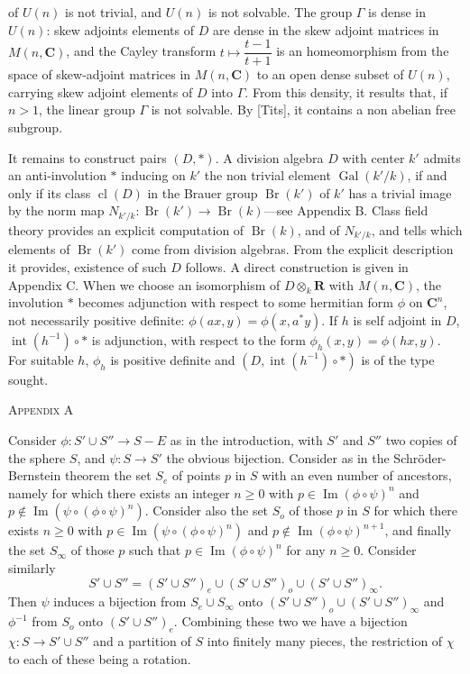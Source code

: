 \documentclass[10pt,a4paper]{article}
\DeclareMathOperator{\Gal}{Gal}
\DeclareMathOperator{\Br}{Br}
\DeclareMathOperator{\cl}{cl}
\DeclareMathOperator{\ImOp}{Im}
\newcommand{\Intop}{\operatorname{int}}
\newcommand{\AppendixHeading}[1]{\par\vspace{1.2em}\begin{center}\textsc{Appendix #1}\end{center}\vspace{0.6em}\par}
\begin{document}
\newpage
of $U(n)$ is not trivial, and $U(n)$ is not solvable. The group $\Gamma$ is dense in $U(n)$:
skew adjoints elements of $D$ are dense in the skew adjoint matrices in $M(n,\mathbf{C})$,
and the Cayley transform $t\mapsto\dfrac{t-1}{t+1}$ is an homeomorphism from the space of
skew-adjoint matrices in $M(n,\mathbf{C})$ to an open dense subset of $U(n)$, carrying
skew adjoint elements of $D$ into $\Gamma$. From this density, it results that, if $n>1$,
the linear group $\Gamma$ is not solvable. By [Tits], it contains a non abelian free
subgroup.

It remains to construct pairs $(D,*)$. A division algebra $D$ with center $k'$
admits an anti-involution $*$ inducing on $k'$ the non trivial element $\Gal(k'/k)$, if
and only if its class $\cl(D)$ in the Brauer group $\Br(k')$ of $k'$ has a trivial image
by the norm map $N_{k'/k}:\Br(k')\to\Br(k)$---see Appendix B. Class field theory
provides an explicit computation of $\Br(k)$, and of $N_{k'/k}$, and tells which elements
of $\Br(k')$ come from division algebras. From the explicit description it provides,
existence of such $D$ follows. A direct construction is given in Appendix C. When
we choose an isomorphism of $D\otimes_k\mathbf{R}$ with $M(n,\mathbf{C})$, the involution $*$ becomes
adjunction with respect to some hermitian form $\phi$ on $\mathbf{C}^n$, not necessarily positive
definite: $\phi(ax,y)=\phi(x,a^*y)$. If $h$ is self adjoint in $D$, $\Intop(h^{-1})\circ *$ is adjunction,
with respect to the form $\phi_h(x,y)=\phi(hx,y)$. For suitable $h$, $\phi_h$ is positive definite
and $(D,\Intop(h^{-1})\circ *)$ is of the type sought.

\AppendixHeading{A}
Consider $\phi:S'\cup S''\to S-E$ as in the introduction, with $S'$ and $S''$ two
copies of the sphere $S$, and $\psi:S\to S'$ the obvious bijection. Consider as in the
Schröder-Bernstein theorem the set $S_e$ of points $p$ in $S$ with an even number
of ancestors, namely for which there exists an integer $n\geq0$ with $p\in\ImOp(\phi\circ\psi)^n$
and $p\notin\ImOp(\psi\circ(\phi\circ\psi)^n)$. Consider also the set $S_o$ of those $p$ in $S$ for which there
exists $n\geq0$ with $p\in\ImOp(\psi\circ(\phi\circ\psi)^n)$ and $p\notin\ImOp(\phi\circ\psi)^{n+1}$, and finally the set $S_\infty$
of those $p$ such that $p\in\ImOp(\phi\circ\psi)^n$ for any $n\geq0$. Consider similarly
\[
S'\cup S''=(S'\cup S'')_e\cup(S'\cup S'')_o\cup(S'\cup S'')_\infty.
\]
Then $\psi$ induces a bijection from $S_e\cup S_\infty$ onto $(S'\cup S'')_o\cup(S'\cup S'')_\infty$ and $\phi^{-1}$
from $S_o$ onto $(S'\cup S'')_e$. Combining these two we have a bijection $\chi:S\to S'\cup S''$
and a partition of $S$ into finitely many pieces, the restriction of $\chi$ to each of
these being a rotation.
\end{document}
